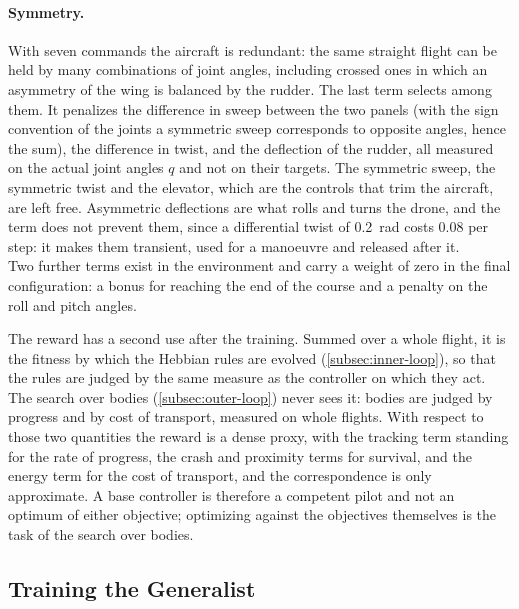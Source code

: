 \paragraph{Symmetry.} With seven commands the aircraft is redundant: the same straight flight can be held by many combinations of joint angles, including crossed ones in which an asymmetry of the wing is balanced by the rudder. The last term selects among them. It penalizes the difference in sweep between the two panels (with the sign convention of the joints a symmetric sweep corresponds to opposite angles, hence the sum), the difference in twist, and the deflection of the rudder, all measured on the actual joint angles $q$ and not on their targets. The symmetric sweep, the symmetric twist and the elevator, which are the controls that trim the aircraft, are left free. Asymmetric deflections are what rolls and turns the drone, and the term does not prevent them, since a differential twist of 0.2~rad costs 0.08 per step: it makes them transient, used for a manoeuvre and released after it. \\

Two further terms exist in the environment and carry a weight of zero in the final configuration: a bonus for reaching the end of the course and a penalty on the roll and pitch angles.

The reward has a second use after the training. Summed over a whole flight, it is the fitness by which the Hebbian rules are evolved (\autoref{subsec:inner-loop}), so that the rules are judged by the same measure as the controller on which they act. The search over bodies (\autoref{subsec:outer-loop}) never sees it: bodies are judged by progress and by cost of transport, measured on whole flights. With respect to those two quantities the reward is a dense proxy, with the tracking term standing for the rate of progress, the crash and proximity terms for survival, and the energy term for the cost of transport, and the correspondence is only approximate. A base controller is therefore a competent pilot and not an optimum of either objective; optimizing against the objectives themselves is the task of the search over bodies.

\subsection{Training the Generalist}
\label{subsec:generalist-training}


